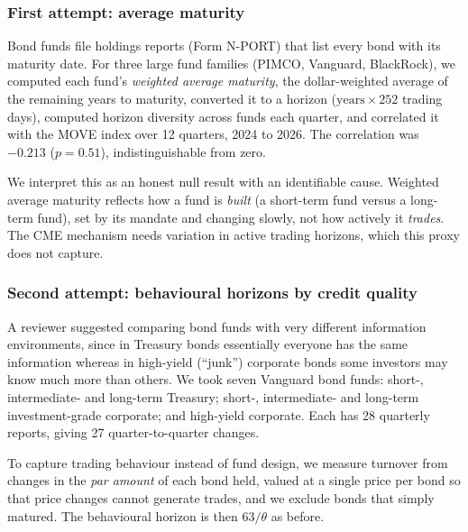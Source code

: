 \subsubsection{First attempt: average maturity}

Bond funds file holdings reports (Form N-PORT) that list every bond with its maturity date. For three large fund families (PIMCO, Vanguard, BlackRock), we computed each fund's \emph{weighted average maturity}, the dollar-weighted average of the remaining years to maturity, converted it to a horizon ($\text{years}\times252$ trading days), computed horizon diversity across funds each quarter, and correlated it with the MOVE index over 12 quarters, 2024 to 2026. The correlation was $-0.213$ ($p=0.51$), indistinguishable from zero.

We interpret this as an honest null result with an identifiable cause. Weighted average maturity reflects how a fund is \emph{built} (a short-term fund versus a long-term fund), set by its mandate and changing slowly, not how actively it \emph{trades}. The CME mechanism needs variation in active trading horizons, which this proxy does not capture.

\subsubsection{Second attempt: behavioural horizons by credit quality}

A reviewer suggested comparing bond funds with very different information environments, since in Treasury bonds essentially everyone has the same information whereas in high-yield (``junk'') corporate bonds some investors may know much more than others. We took seven Vanguard bond funds: short-, intermediate- and long-term Treasury; short-, intermediate- and long-term investment-grade corporate; and high-yield corporate. Each has 28 quarterly reports, giving 27 quarter-to-quarter changes.

To capture trading behaviour instead of fund design, we measure turnover from changes in the \emph{par amount} of each bond held, valued at a single price per bond so that price changes cannot generate trades, and we exclude bonds that simply matured. The behavioural horizon is then $63/\theta$ as before.

